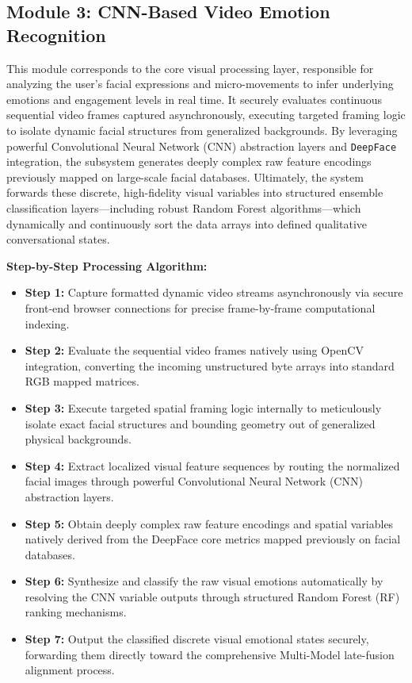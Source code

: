 \documentclass[11pt]{report}
\begin{document}
\subsection{Module 3: CNN-Based Video Emotion Recognition}
This module corresponds to the core visual processing layer, responsible for analyzing the user's facial expressions and micro-movements to infer underlying emotions and engagement levels in real time. It securely evaluates continuous sequential video frames captured asynchronously, executing targeted framing logic to isolate dynamic facial structures from generalized backgrounds. By leveraging powerful Convolutional Neural Network (CNN) abstraction layers and \texttt{DeepFace} integration, the subsystem generates deeply complex raw feature encodings previously mapped on large-scale facial databases. Ultimately, the system forwards these discrete, high-fidelity visual variables into structured ensemble classification layers—including robust Random Forest algorithms—which dynamically and continuously sort the data arrays into defined qualitative conversational states.

\vspace{0.3cm}
\textbf{Step-by-Step Processing Algorithm:}
\begin{itemize}
    \item \textbf{Step 1:} Capture formatted dynamic video streams asynchronously via secure front-end browser connections for precise frame-by-frame computational indexing.
    \item \textbf{Step 2:} Evaluate the sequential video frames natively using OpenCV integration, converting the incoming unstructured byte arrays into standard RGB mapped matrices.
    \item \textbf{Step 3:} Execute targeted spatial framing logic internally to meticulously isolate exact facial structures and bounding geometry out of generalized physical backgrounds.
    \item \textbf{Step 4:} Extract localized visual feature sequences by routing the normalized facial images through powerful Convolutional Neural Network (CNN) abstraction layers.
    \item \textbf{Step 5:} Obtain deeply complex raw feature encodings and spatial variables natively derived from the DeepFace core metrics mapped previously on facial databases.
    \item \textbf{Step 6:} Synthesize and classify the raw visual emotions automatically by resolving the CNN variable outputs through structured Random Forest (RF) ranking mechanisms.
    \item \textbf{Step 7:} Output the classified discrete visual emotional states securely, forwarding them directly toward the comprehensive Multi-Model late-fusion alignment process.
\end{itemize}
\end{document}
